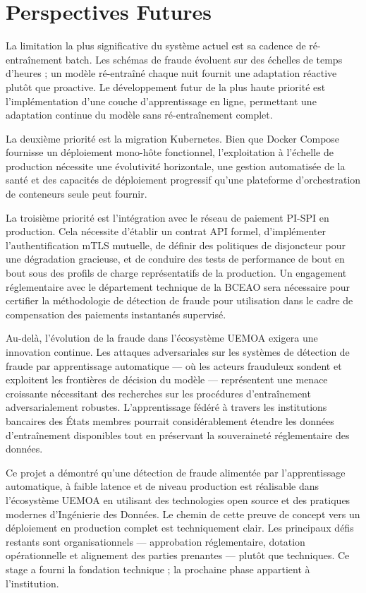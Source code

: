 \documentclass[12pt,a4paper,oneside]{book}
\theoremstyle{definition}
\theoremstyle{plain}
\begin{document}
\section{Perspectives Futures}

La limitation la plus significative du système actuel est sa cadence de ré-entraînement batch. Les schémas de fraude évoluent sur des échelles de temps d'heures ; un modèle ré-entraîné chaque nuit fournit une adaptation réactive plutôt que proactive. Le développement futur de la plus haute priorité est l'implémentation d'une couche d'apprentissage en ligne, permettant une adaptation continue du modèle sans ré-entraînement complet.

La deuxième priorité est la migration Kubernetes. Bien que Docker Compose fournisse un déploiement mono-hôte fonctionnel, l'exploitation à l'échelle de production nécessite une évolutivité horizontale, une gestion automatisée de la santé et des capacités de déploiement progressif qu'une plateforme d'orchestration de conteneurs seule peut fournir.

La troisième priorité est l'intégration avec le réseau de paiement PI-SPI en production. Cela nécessite d'établir un contrat API formel, d'implémenter l'authentification mTLS mutuelle, de définir des politiques de disjoncteur pour une dégradation gracieuse, et de conduire des tests de performance de bout en bout sous des profils de charge représentatifs de la production. Un engagement réglementaire avec le département technique de la BCEAO sera nécessaire pour certifier la méthodologie de détection de fraude pour utilisation dans le cadre de compensation des paiements instantanés supervisé.

Au-delà, l'évolution de la fraude dans l'écosystème UEMOA exigera une innovation continue. Les attaques adversariales sur les systèmes de détection de fraude par apprentissage automatique — où les acteurs frauduleux sondent et exploitent les frontières de décision du modèle — représentent une menace croissante nécessitant des recherches sur les procédures d'entraînement adversarialement robustes. L'apprentissage fédéré à travers les institutions bancaires des États membres pourrait considérablement étendre les données d'entraînement disponibles tout en préservant la souveraineté réglementaire des données.

Ce projet a démontré qu'une détection de fraude alimentée par l'apprentissage automatique, à faible latence et de niveau production est réalisable dans l'écosystème UEMOA en utilisant des technologies open source et des pratiques modernes d'Ingénierie des Données. Le chemin de cette preuve de concept vers un déploiement en production complet est techniquement clair. Les principaux défis restants sont organisationnels — approbation réglementaire, dotation opérationnelle et alignement des parties prenantes — plutôt que techniques. Ce stage a fourni la fondation technique ; la prochaine phase appartient à l'institution.
\end{document}
